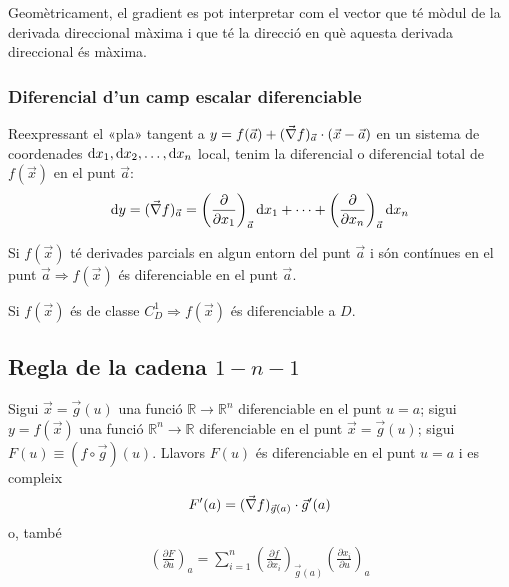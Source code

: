 Geomètricament, el gradient es pot interpretar com el vector que té mòdul de la derivada direccional màxima i que té la direcció en què aquesta derivada direccional és màxima.

\subsubsection*{Diferencial d'un camp escalar diferenciable}
\begin{defi}
    Reexpressant el «pla» tangent a $y = f(\vec{a}) + (\vec{\nabla} f)_{\vec{a}} \cdot (\vec{x} - \vec{a})$ en un sistema de coordenades $\mathrm{d} x_{1}, \mathrm{d} x_{2}, \dots , \mathrm{d} x_{n}$ local, tenim la diferencial o diferencial total de $f(\vec{x})$ en el punt $\vec{a}$:
    \begin{align}
        \mathrm{d} y = (\vec{\nabla} f)_{\vec{a}} = \left( \frac{\partial}{\partial x_{1}} \right)_{\vec{a}} \mathop{}\!\mathrm{d} x_{1} + \dots + \left( \frac{\partial}{\partial x_{n}} \right)_{\vec{a}} \mathop{}\!\mathrm{d} x_{n}
    \end{align}
\end{defi}

\begin{thm}
    Si $f(\vec{x})$ té derivades parcials en algun entorn del punt $\vec{a}$ i són contínues en el punt $\vec{a} \Rightarrow f(\vec{x})$ és diferenciable en el punt $\vec{a}$. 
\end{thm}
\begin{cor}
    Si $f(\vec{x})$ és de classe $C_{D}^{1} \Rightarrow f(\vec{x})$ és diferenciable a $D$.
\end{cor}

\subsection{Regla de la cadena $1-n-1$}
Sigui $\vec{x} = \vec{g}(u)$ una funció $\mathbb{R} \to \mathbb{R}^{n}$ diferenciable en el punt $u = a$; sigui $y=f(\vec{x})$ una funció $\mathbb{R}^{n} \to \mathbb{R}$ diferenciable en el punt $\vec{x} = \vec{g}(u)$; sigui $F(u) \equiv (f \circ \vec{g})(u)$. Llavors $F(u)$ és diferenciable en el punt $u = a$ i es compleix
\begin{align}
    F'(a) = (\vec{\nabla} f)_{\vec{g}(a)} \cdot \vec{g}'(a)
\end{align}
o, també
\begin{align}
    \left( \frac{\partial F}{\partial u} \right)_{a} = \sum_{i=1}^{n}  \left( \frac{\partial f}{\partial x_{i}} \right)_{\vec{g}(a)}  \left( \frac{\partial x_{i}}{\partial u} \right)_{a}
\end{align}

